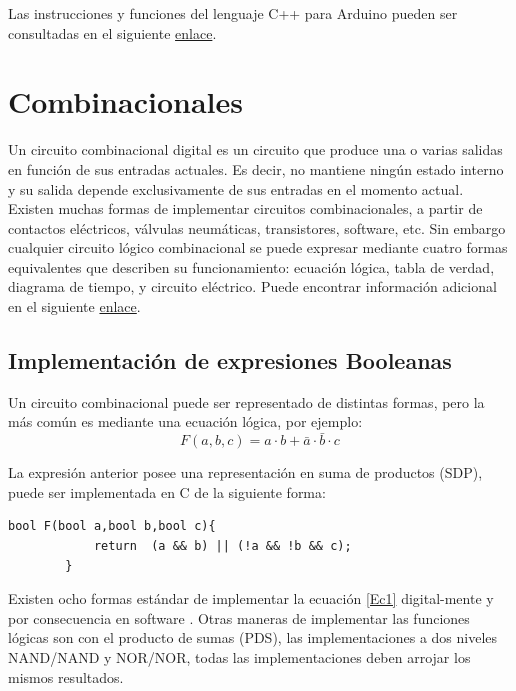 Las instrucciones y funciones del lenguaje C++ para Arduino pueden ser consultadas en el siguiente \href{https://www.arduino.cc/reference/en/}{enlace}.


\section{Combinacionales}

Un circuito combinacional digital es un circuito que produce una o varias salidas en función de sus entradas actuales. Es decir, no mantiene ningún estado interno y su salida depende exclusivamente de sus entradas en el momento actual.
Existen muchas formas de implementar circuitos combinacionales, a partir de contactos eléctricos, válvulas neumáticas, transistores, software, etc. Sin embargo cualquier circuito lógico combinacional se puede expresar mediante cuatro formas equivalentes que describen su funcionamiento: ecuación lógica, tabla de verdad, diagrama de tiempo, y circuito eléctrico. 
Puede encontrar información adicional en el siguiente \href{https://es.wikipedia.org/wiki/Sistema_combinacional}{enlace}.   

\subsection{Implementación de expresiones Booleanas}

Un circuito combinacional  puede ser representado de distintas formas, pero la más común es mediante una ecuación lógica, por ejemplo: 
\begin{equation}
\label{Ec1}
F(a,b,c)=a\cdot b+\bar{a}\cdot \bar{b}\cdot c
\end{equation}

La expresión anterior posee una representación en suma de productos (SDP), puede ser implementada en C de la siguiente forma:

		 \begin{lstlisting}[language=Arduino,numbers=none, showstringspaces=false]
		bool F(bool a,bool b,bool c){
			return  (a && b) || (!a && !b && c);
		}
		\end{lstlisting} 

Existen ocho formas estándar de implementar la ecuación \eqref{Ec1} digital-mente y por consecuencia en software . Otras maneras de implementar las funciones lógicas  son con el producto de sumas (PDS), las implementaciones a dos niveles  NAND/NAND y NOR/NOR, todas las implementaciones deben arrojar los mismos resultados.

